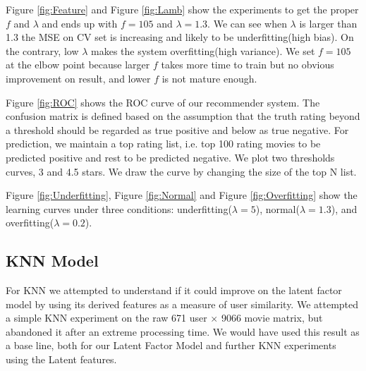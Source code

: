 \documentclass[10pt]{article}
\begin{document}
Figure \ref{fig:Feature} and Figure \ref{fig:Lamb} show the  experiments to get the proper $f$ and $\lambda$ and ends up with $f=105$ and $\lambda = 1.3$. We can see when $\lambda$ is larger than 1.3 the MSE on CV set is increasing and likely to be underfitting(high bias). On the contrary, low $\lambda$ makes the system overfitting(high variance). We set $f=105$ at the elbow point because larger $f$ takes more time to train but no obvious improvement on result, and lower $f$ is not mature enough.

Figure \ref{fig:ROC} shows the ROC curve of our recommender system. The confusion matrix is defined based on the assumption that the truth rating beyond a threshold should be regarded as true positive and below as true negative\cite{CF_Recsys_Survey}. For prediction, we maintain a top rating list, i.e. top 100 rating movies to be predicted positive and rest to be predicted negative. We plot two thresholds curves, 3 and 4.5 stars. We draw the curve by changing the size of the top N list.

Figure \ref{fig:Underfitting}, Figure \ref{fig:Normal} and Figure \ref{fig:Overfitting} show the learning curves under three conditions: underfitting($\lambda = 5$), normal($\lambda = 1.3$), and overfitting($\lambda = 0.2$).

\subsection{KNN Model}
For KNN we attempted to understand if it could improve on the latent factor model by using its derived features as a measure of user similarity. We attempted a simple KNN experiment on the raw 671 user $\times$ 9066 movie matrix, but abandoned it after an extreme processing time. We would have used this result as a base line, both for our Latent Factor Model and further KNN experiments using the Latent features.
\end{document}
